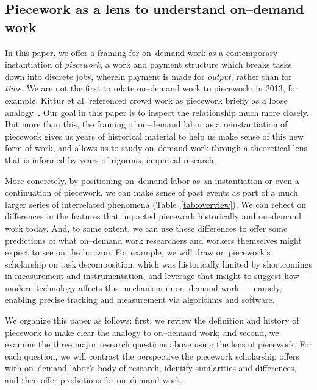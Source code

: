 \documentclass[pn4226]{subfiles}
\begin{document}
\subsection{Piecework as a lens to understand on--demand work}
In this paper, we offer a framing for on--demand work as a contemporary instantiation of \textit{piecework},
a work and payment structure which breaks tasks down into discrete jobs,
wherein payment is made for \textit{output}, rather than for \textit{time}.
We are not the first to relate on--demand work to piecework: in 2013, for example,
Kittur et al. referenced crowd work as piecework briefly
as a loose analogy~\cite{crowdworkFuture}.
Our goal in this paper is to inspect the relationship much more closely.
But more than this,
the framing of on--demand labor as a reinstantiation of piecework 
gives us years of historical material to help us make sense of this new form of work, and
allows us to study on--demand work through a theoretical lens that is informed by years of rigorous, empirical research.

More concretely, by positioning on--demand labor as
an instantiation or even a continuation of piecework, we can make sense of past events as part of a much larger series of interrelated phenomena (Table~\ref{tab:overview}).
We can reflect on differences in the features that impacted piecework historically and on--demand work today.
And, to some extent, we can use these differences to offer some predictions of what on--demand work researchers
and workers themselves
might expect to see on the horizon.
For example, we will draw on piecework's scholarship on task decomposition,
which was historically limited by shortcomings in measurement and instrumentation, and
leverage that insight to suggest how modern technology affects this mechanism in on--demand work
--- namely, enabling precise tracking and measurement via algorithms and software.

We organize this paper as follows:
first, we review the definition and history of piecework
to make clear the analogy to on--demand work;
and second, we examine the three major research questions above using the lens of piecework. 
For each question, we will
contrast the perspective the piecework scholarship offers with on--demand labor's body of research,
identify similarities and differences, and then
offer predictions for on--demand work.

\end{document}
